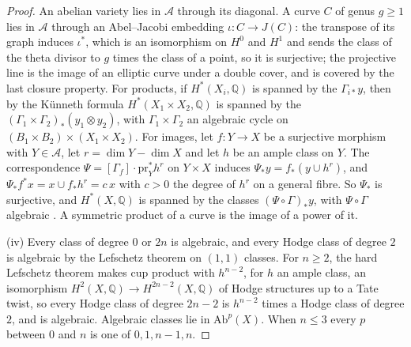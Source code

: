 \documentclass[11pt,reqno]{amsart}
\theoremstyle{plain}
\theoremstyle{definition}
\theoremstyle{remark}
\newcommand{\QQ}{\mathbb{Q}}
\begin{document}
\begin{proof}
An abelian variety lies in $\mathcal{A}$ through its diagonal. A curve $C$
of genus $g\ge1$ lies in $\mathcal{A}$ through an Abel--Jacobi embedding
$\iota\colon C\to J(C)$: the transpose of its graph induces $\iota^{*}$,
which is an isomorphism on $H^{0}$ and $H^{1}$ and sends the class of the
theta divisor to $g$ times the class of a point, so it is surjective; the
projective line is the image of an elliptic curve under a double cover, and
is covered by the last closure property. For products, if $H^{*}(X_{i},\QQ)$
is spanned by the $\Gamma_{i*}y$, then by the K\"unneth formula
$H^{*}(X_{1}\times X_{2},\QQ)$ is spanned by the
$(\Gamma_{1}\times\Gamma_{2})_{*}(y_{1}\otimes y_{2})$, with
$\Gamma_{1}\times\Gamma_{2}$ an algebraic cycle on
$(B_{1}\times B_{2})\times(X_{1}\times X_{2})$. For images, let
$f\colon Y\to X$ be a surjective morphism with $Y\in\mathcal{A}$, let
$r=\dim Y-\dim X$ and let $h$ be an ample class on $Y$. The correspondence
$\Psi=[\Gamma_{f}]\cdot\mathrm{pr}_{Y}^{*}h^{r}$ on $Y\times X$ induces
$\Psi_{*}y=f_{*}(y\cup h^{r})$, and
$\Psi_{*}f^{*}x=x\cup f_{*}h^{r}=c\,x$ with $c>0$ the degree of $h^{r}$ on a
general fibre. So $\Psi_{*}$ is surjective, and $H^{*}(X,\QQ)$ is spanned by
the classes $(\Psi\circ\Gamma)_{*}y$, with $\Psi\circ\Gamma$ algebraic
\cite[Chapter~16]{Ful98}. A symmetric product of a curve is the image of a
power of it.

(iv) Every class of degree $0$ or $2n$ is algebraic, and every Hodge class of
degree $2$ is algebraic by the Lefschetz theorem on $(1,1)$ classes. For
$n\ge2$, the hard Lefschetz theorem makes cup product with $h^{n-2}$, for $h$
an ample class, an isomorphism $H^{2}(X,\QQ)\to H^{2n-2}(X,\QQ)$ of Hodge
structures up to a Tate twist, so every Hodge class of degree $2n-2$ is
$h^{n-2}$ times a Hodge class of degree $2$, and is algebraic. Algebraic
classes lie in $\mathrm{Ab}^{p}(X)$. When $n\le3$ every $p$ between $0$ and
$n$ is one of $0,1,n-1,n$.
\end{proof}
\end{document}
